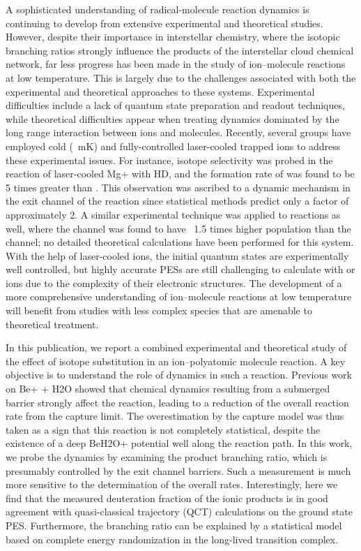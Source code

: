 A sophisticated understanding of radical-molecule reaction dynamics is continuing to develop from extensive experimental and theoretical studies. However, despite their importance in interstellar chemistry, where the isotopic branching ratios strongly influence the products of the interstellar cloud chemical network, far less progress has been made in the study of ion–molecule reactions at low temperature. This is largely due to the challenges associated with both the experimental and theoretical approaches to these systems.\cite{Clary1990,Dateo1989,Adams1976,Armentrout2002,Sims2002,Smith2000,Snow2008} Experimental difficulties include a lack of quantum state preparation and readout techniques, while theoretical difficulties appear when treating dynamics dominated by the long range interaction between ions and molecules. Recently, several groups have employed cold (~mK) and fully-controlled laser-cooled trapped ions to address these experimental issues. For instance, isotope selectivity was probed in the reaction of laser-cooled Mg+ with HD, and the formation rate of  was found to be 5 times greater than . This observation was ascribed to a dynamic mechanism in the exit channel of the reaction since statistical methods predict only a factor of approximately 2.\cite{Dalleska2005} A similar experimental technique was applied to  reactions as well,\cite{Hansen2012} where the  channel was found to have ~1.5 times higher population than the  channel; no detailed theoretical calculations have been performed for this system. With the help of laser-cooled ions, the initial quantum states are experimentally well controlled, but highly accurate PESs are still challenging to calculate with  or  ions due to the complexity of their electronic structures. The development of a more comprehensive understanding of ion–molecule reactions at low temperature will benefit from studies with less complex species that are amenable to theoretical treatment.

In this publication, we report a combined experimental and theoretical study of the effect of isotope substitution in an ion–polyatomic molecule reaction. A key objective is to understand the role of dynamics in such a reaction. Previous work on Be+ + H2O showed that chemical dynamics resulting from a submerged barrier strongly affect the reaction, leading to a reduction of the overall reaction rate from the capture limit. The overestimation by the capture model was thus taken as a sign that this reaction is not completely statistical, despite the existence of a deep BeH2O+ potential well along the reaction path. In this work, we probe the dynamics by examining the product branching ratio, which is presumably controlled by the exit channel barriers. Such a measurement is much more sensitive to the determination of the overall rates. Interestingly,
here we find that the measured deuteration fraction of the ionic products is in good agreement with quasi-classical trajectory (QCT) calculations on the ground state PES. Furthermore, the branching ratio can be explained by a statistical model based on complete energy randomization in the long-lived transition complex.

